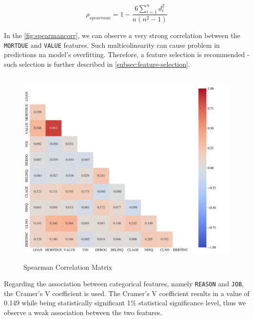 \begin{equation}\label{eq}
\rho_{spearman} = 1 - \frac{6 \sum_{i=1}^{n} d_{i}^{2}}{n \left(n^{2}-1\right)}
\end{equation}


In the \autoref{fig:spearmancorr}, we can observe a very strong correlation between the \texttt{MORTDUE} and \texttt{VALUE} features. Such multicolinearity can cause problem in predictions na model's overfitting. Therefore, a feature selection is recommended - such selection is further described in \autoref{subsec:feature-selection}.

\begin{figure}[H]
    \centering
    \caption{Spearman Correlation Matrix}\vspace{0.5em}
    \label{fig:spearmancorr}\
    \includegraphics[width=150mm]{Figures/Spearman_Correlation_Matrix_Numeric_Features.jpg}

    \vspace{-1em}
\end{figure}

Regarding the association between categorical features, namely \texttt{REASON} and \texttt{JOB}, the Cramer's V coefficient is used. The Cramer's V coefficient results in a value of 0.149 while being statistically significant 1\% statistical significance level, thus we observe a weak association between the two features.


